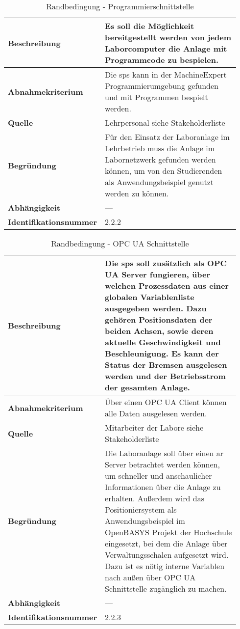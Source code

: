 \documentclass[../Bachelorarbeit.tex]{subfiles}
\begin{document}
\begin{table}[H]
    \centering
    \begin{tabular}{| p{0.34\linewidth} | p{0.6\linewidth} |}
        \hline
        \textbf{Beschreibung} & Es soll die Möglichkeit bereitgestellt werden von jedem Laborcomputer die Anlage mit Programmcode zu bespielen. \\ \hline
        \textbf{Abnahmekriterium} & Die \acs{sps} kann in der MachineExpert Programmierumgebung gefunden und mit Programmen bespielt werden. \\ \hline
        \textbf{Quelle} & Lehrpersonal siehe Stakeholderliste \\ \hline
        \textbf{Begründung} & Für den Einsatz der Laboranlage im Lehrbetrieb muss die Anlage im Labornetzwerk gefunden werden können, um von den Studierenden als Anwendungsbeispiel genutzt werden zu können. \\ \hline
        \textbf{Abhängigkeit} & -\xspace -\xspace - \\ \hline
        \textbf{Identifikationsnummer} & 2.2.2 \\ \hline
    \end{tabular}
    \caption[\acs{nfa} - Programmierschnittstelle]{Randbedingung - Programmierschnittstelle}
    \label{tab:my-table22}
\end{table}

\begin{table}[H]
    \centering
    \begin{tabular}{| p{0.34\linewidth} | p{0.6\linewidth} |}
        \hline
        \textbf{Beschreibung} & Die \acs{sps} soll zusätzlich als OPC UA Server fungieren, über welchen Prozessdaten aus einer globalen Variablenliste ausgegeben werden. Dazu gehören Positionsdaten der beiden Achsen, sowie deren aktuelle Geschwindigkeit und Beschleunigung. Es kann der Status der Bremsen ausgelesen werden und der Betriebsstrom der gesamten Anlage. \\ \hline
        \textbf{Abnahmekriterium} & Über einen OPC UA Client können alle Daten ausgelesen werden. \\ \hline
        \textbf{Quelle} & Mitarbeiter der Labore siehe Stakeholderliste \\ \hline
        \textbf{Begründung} & Die Laboranlage soll über einen \acs{ar} Server betrachtet werden können, um schneller und anschaulicher Informationen über die Anlage zu erhalten. Außerdem wird das Positioniersystem als Anwendungsbeispiel im OpenBASYS Projekt der Hochschule eingesetzt, bei dem die Anlage über Verwaltungsschalen aufgesetzt wird. Dazu ist es nötig interne Variablen nach außen über OPC UA Schnittstelle zugänglich zu machen. \\ \hline
        \textbf{Abhängigkeit} & -\xspace -\xspace - \\ \hline
        \textbf{Identifikationsnummer} & 2.2.3 \\ \hline
    \end{tabular}
    \caption[\acs{nfa} - OPC UA Schnittstelle]{Randbedingung - OPC UA Schnittstelle}
    \label{tab:my-table23}
\end{table}
\end{document}
